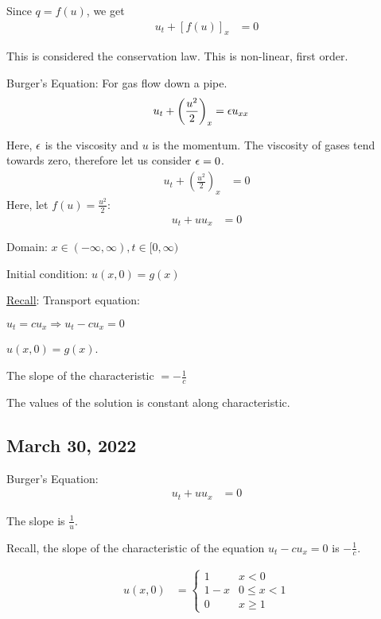 \documentclass{article}
\begin{document}
  Since $q = f(u)$, we get
  \begin{align}
    u_t + [f(u)]_x & = 0
  \end{align}

  This is considered the conservation law. This is non-linear, first order.

  \ex Burger's Equation: For gas flow down a pipe.
  \begin{align}
    u_t + \left( \frac{u^2}{2} \right)_x & = \epsilon u_{xx}
  \end{align}

  Here, $\epsilon$ is the viscosity and $u$ is the momentum. The viscosity of gases tend towards zero, therefore let us consider $\epsilon = 0$.
  \begin{align}
    u_t + \left( \frac{u^2}{2} \right)_x & = 0
  \end{align}
  Here, let $f(u) = \frac{u^2}{2}$:
  \begin{align}
    u_t + u u_x & = 0
  \end{align}

  Domain: $x \in (-\infty, \infty), t \in [0, \infty)$

  Initial condition: $u(x, 0) = g(x)$

  \underline{Recall}: Transport equation:

  $u_t = cu_x \Rightarrow u_t - cu_x = 0$

  $u(x, 0) = g(x)$.

  The slope of the characteristic $ = -\frac{1}{c}$

  The values of the solution is constant along characteristic.

  \subsection*{March 30, 2022}
  Burger's Equation:
  \begin{align}
    u_t + uu_x & = 0
  \end{align}

  The slope is $\frac{1}{u}$.

  Recall, the slope of the characteristic of the equation $u_t - cu_x = 0$ is $-\frac{1}{c}$.

  \ex
  \begin{align}
    u(x, 0) & =
    \begin{cases}
      1     &         x < 0\\
      1 - x & 0 \leq  x < 1\\
      0     & x \geq  1
    \end{cases}
  \end{align}
\end{document}
